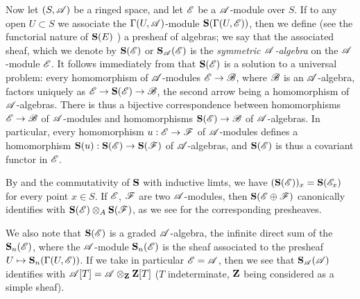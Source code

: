 \begin{env}[1.7.4]
\label{2.1.7.4}
Now let $(S,\mathscr{A})$ be a ringed space, and let $\mathscr{E}$ be a $\mathscr{A}$-module over $S$.
If to any open $U\subset S$ we associate the $\Gamma(U,\mathscr{A})$-module $\mathbf{S}(\Gamma(U,\mathscr{E}))$, then we define (see the functorial nature of $\mathbf{S}(E)$ ) a presheaf of algebras; we say that the associated sheaf, which we denote by $\mathbf{S}(\mathscr{E})$ or $\mathbf{S}_\mathscr{A}(\mathscr{E})$ is the \emph{symmetric $\mathscr{A}$-algebra} on the $\mathscr{A}$-module $\mathscr{E}$.
It follows immediately from  that $\mathbf{S}(\mathscr{E})$ is a solution to a universal problem: every homomorphism of $\mathscr{A}$-modules $\sh{E}\to\sh{B}$, where $\mathscr{B}$ is an $\mathscr{A}$-algebra, factors uniquely as $\sh{E}\to\bb{S}(\sh{E})\to\sh{B}$, the second arrow being a homomorphism of $\mathscr{A}$-algebras.
There is thus a bijective correspondence between homomorphisms $\sh{E}\to\sh{B}$ of $\mathscr{A}$-modules and homomorphisms $\bb{S}(\sh{E})\to\sh{B}$ of $\mathscr{A}$-algebras.
In particular, every homomorphism $u:\sh{E}\to\sh{F}$ of $\mathscr{A}$-modules defines a homomorphism $\bb{S}(u):\bb{S}(\sh{E})\to\bb{S}(\sh{F})$ of $\mathscr{A}$-algebras, and $\mathbf{S}(\mathscr{E})$ is thus a covariant functor in $\mathscr{E}$.

By  and the commutativity of $\mathbf{S}$ with inductive limts, we have $(\mathbf{S}(\mathscr{E}))_x=\mathbf{S}(\mathscr{E}_x)$ for every point $x\in S$.
If $\mathscr{E}$, $\mathscr{F}$ are two $\mathscr{A}$-modules, then $\mathbf{S}(\mathscr{E}\oplus\mathscr{F})$ canonically identifies with $\mathbf{S}(\mathscr{E})\otimes_A\mathbf{S}(\mathscr{F})$, as we see for the corresponding presheaves.

We also note that $\mathbf{S}(\mathscr{E})$ is a graded $\mathscr{A}$-algebra, the infinite direct sum of the $\mathbf{S}_n(\mathscr{E})$, where the $\mathscr{A}$-module $\mathbf{S}_n(\mathscr{E})$ is the sheaf associated to the presheaf $U\mapsto\bb{S}_n(\Gamma(U,\sh{E}))$.
If we take in particular $\mathscr{E}=\mathscr{A}$, then we see that $\mathbf{S}_\mathscr{A}(\mathscr{A})$ identifies with $\mathscr{A}[T]=\mathscr{A}\otimes_\mathbf{Z}\mathbf{Z}[T]$ ($T$ indeterminate, $\mathbf{Z}$ being considered as a simple sheaf).
\end{env}

